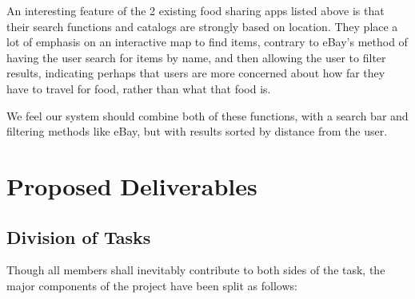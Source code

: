 \documentclass[12pt]{article}
\begin{document}
An interesting feature of the 2 existing food sharing apps listed above is that
their search functions and catalogs are strongly based on location.
They place a lot of emphasis on an interactive map to find items, contrary to
eBay’s method of having the user search for items by name, and then allowing
the user to filter results, indicating perhaps that users are more concerned
about how far they have to travel for food, rather than what that food is.

We feel our system should combine both of these functions, with a search bar
and filtering methods like eBay, but with results sorted by distance from the user.

\pagebreak

\section{Proposed Deliverables}
\subsection{Division of Tasks}

Though all members shall inevitably contribute to both sides of the task,
the major components of the project have been split as follows:
\end{document}
